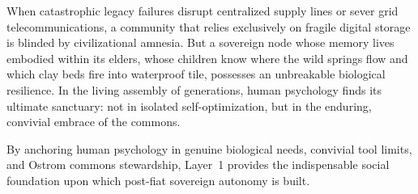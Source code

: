 When catastrophic legacy failures disrupt centralized supply lines or sever grid telecommunications, a community that relies exclusively on fragile digital storage is blinded by civilizational amnesia. But a sovereign node whose memory lives embodied within its elders, whose children know where the wild springs flow and which clay beds fire into waterproof tile, possesses an unbreakable biological resilience. In the living assembly of generations, human psychology finds its ultimate sanctuary: not in isolated self-optimization, but in the enduring, convivial embrace of the commons.

By anchoring human psychology in genuine biological needs, convivial tool limits, and Ostrom commons stewardship, Layer~1 provides the indispensable social foundation upon which post-fiat sovereign autonomy is built.

